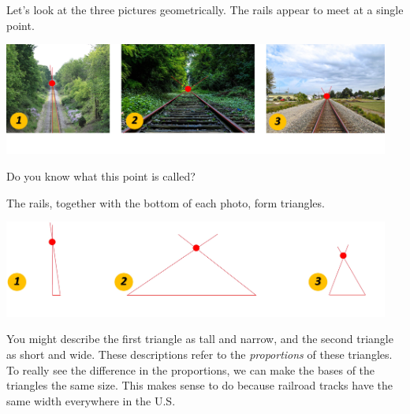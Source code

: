 \documentclass{ximera}
\begin{document}
\begin{exploration}\label{exp:trianglesAtBase}
    Let's look at the three pictures geometrically.  The rails appear to meet at a single point.  
    
\begin{image}
         \includegraphics[width=5in]{vanishingPoint.jpg}
\end{image}
    
    Do you know what this point is called?
    \begin{multipleChoice}
    \end{multipleChoice}

The rails, together with the bottom of each photo, form triangles.  

\begin{image}
         \includegraphics[width=5in]{triangles.jpg}
\end{image}

You might describe the first triangle as tall and narrow, and the second triangle as short and wide.  These descriptions refer to the \emph{proportions} of these triangles.  To really see the difference in the proportions, we can make the bases of the triangles the same size.  This makes sense to do because railroad tracks have the same width everywhere in the U.S.


\end{exploration}
\end{document}
